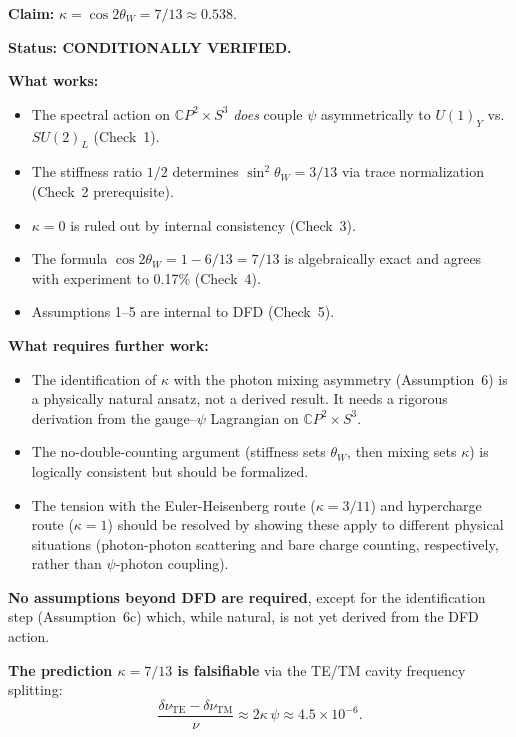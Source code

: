 \documentclass[aps,prd,twocolumn,superscriptaddress,nofootinbib]{revtex4-2}
\newcommand{\CP}{\mathbb{C}P}
\begin{document}
\begin{tcolorbox}[colback=blue!5!white, colframe=blue!60!black,
  title=Summary Assessment]

\textbf{Claim:} $\kappa = \cos 2\theta_W = 7/13 \approx 0.538$.

\medskip
\textbf{Status: CONDITIONALLY VERIFIED.}

\medskip
\textbf{What works:}
\begin{itemize}
\item The spectral action on $\CP^2 \times S^3$ \emph{does} couple
$\psi$ asymmetrically to $U(1)_Y$ vs.\ $SU(2)_L$ (Check~1). \checkmark
\item The stiffness ratio $1/2$ determines $\sin^2\theta_W = 3/13$
via trace normalization (Check~2 prerequisite). \checkmark
\item $\kappa = 0$ is ruled out by internal consistency (Check~3). \checkmark
\item The formula $\cos 2\theta_W = 1 - 6/13 = 7/13$ is algebraically
exact and agrees with experiment to 0.17\% (Check~4). \checkmark
\item Assumptions 1--5 are internal to DFD (Check~5). \checkmark
\end{itemize}

\medskip
\textbf{What requires further work:}
\begin{itemize}
\item The identification of $\kappa$ with the photon mixing
asymmetry (Assumption~6) is a physically natural ansatz, not a
derived result.  It needs a rigorous derivation from the
gauge--$\psi$ Lagrangian on $\CP^2 \times S^3$.
\item The no-double-counting argument (stiffness sets $\theta_W$,
then mixing sets $\kappa$) is logically consistent but should be
formalized.
\item The tension with the Euler-Heisenberg route ($\kappa = 3/11$)
and hypercharge route ($\kappa = 1$) should be resolved by showing
these apply to different physical situations (photon-photon scattering
and bare charge counting, respectively, rather than $\psi$-photon
coupling).
\end{itemize}

\medskip
\textbf{No assumptions beyond DFD are required}, except for the
identification step (Assumption~6c) which, while natural, is not yet
derived from the DFD action.

\medskip
\textbf{The prediction $\kappa = 7/13$ is falsifiable} via the TE/TM
cavity frequency splitting:
\[
\frac{\delta\nu_{\mathrm{TE}} - \delta\nu_{\mathrm{TM}}}{\nu}
\approx 2\kappa\,\psi \approx 4.5 \times 10^{-6}.
\]
\end{tcolorbox}
\end{document}

